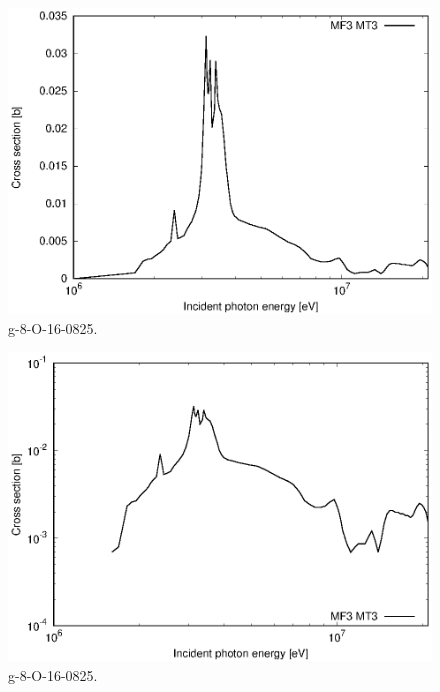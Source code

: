 \begin{figure}
 \includegraphics[width=\linewidth]{eps/g_8-O-16_0825.eps}
  \caption{g-8-O-16-0825.}
\end{figure}
\begin{figure}
 \includegraphics[width=\linewidth]{eps-log/g_8-O-16_0825.eps}
 \caption{g-8-O-16-0825.}
\end{figure}
\newpage \clearpage

